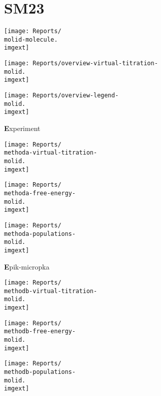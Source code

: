 \documentclass[9pt]{standalone}
\begin{document}
\newcommand{\molid}{SM23}
\newcommand{\imgext}{pdf}
\newcommand{\methoda}{Experiment}
\newcommand{\methodb}{Epik-micropka}
\newcommand{\methodc}{Jaguar-pKa}
\newcommand{\methodd}{Epik-free-energy}
\newcommand{\methode}{Epik-scan}
\section{\molid}
\noindent 
\begin{minipage}[s]{0.35\textwidth}\centering
\texttt{[image: Reports/\\molid-molecule.\\imgext]}
\end{minipage}
\begin{minipage}[s]{0.35\textwidth}
\texttt{[image: Reports/overview-virtual-titration-\\molid.\\imgext]}
\end{minipage}
\begin{minipage}[s]{0.23\textwidth}
\texttt{[image: Reports/overview-legend-\\molid.\\imgext]}
\end{minipage}

\begin{minipage}[s]{\textwidth}\centering
{\textbf \methoda}
\end{minipage}

\noindent
\begin{minipage}[s]{0.33\textwidth}\centering
\texttt{[image: Reports/\\methoda-virtual-titration-\\molid.\\imgext]}
\end{minipage}
\begin{minipage}[s]{0.33\textwidth}
\texttt{[image: Reports/\\methoda-free-energy-\\molid.\\imgext]}
\end{minipage}
\begin{minipage}[s]{0.33\textwidth}
\texttt{[image: Reports/\\methoda-populations-\\molid.\\imgext]}
\end{minipage}

\begin{minipage}[s]{\textwidth}\centering
{\textbf \methodb}
\end{minipage}

\noindent
\begin{minipage}[s]{0.33\textwidth}\centering
\texttt{[image: Reports/\\methodb-virtual-titration-\\molid.\\imgext]}
\end{minipage}
\begin{minipage}[s]{0.33\textwidth}
\texttt{[image: Reports/\\methodb-free-energy-\\molid.\\imgext]}
\end{minipage}
\begin{minipage}[s]{0.33\textwidth}
\texttt{[image: Reports/\\methodb-populations-\\molid.\\imgext]}
\end{minipage}
\end{document}
